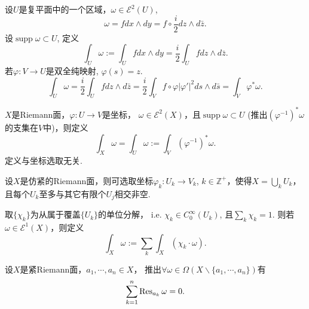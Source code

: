 \begin{definition}
	设$U$是复平面中的一个区域，$\omega\in \mathcal{E}^2(U)$, 
    \[\omega=fdx\wedge dy=f\circ \frac{i}{2}dz\wedge d\bar{z}.\]
    设$\operatorname{supp} \omega\subset U$, 定义
	$$\int_U \omega:=\int_U fdx \wedge dy=\frac{i}{2}\int_U fdz\wedge d\bar{z}.$$
	若$\varphi\colon V\rightarrow U$是双全纯映射, $\varphi(s)=z$.
	$$\int_U\omega =\frac{i}{2}\int_U fdz \wedge d\bar{z}
    =\frac{i}{2}\int_Vf\circ \varphi |\varphi'|^2 ds\wedge d\bar{s}
    =\int_V \varphi^* \omega.$$
\end{definition}
		
\begin{definition}
	$X$是Riemann面，$\varphi\colon U\rightarrow V$是坐标，
    $\omega\in \mathcal{E}^2(X)$，且$\operatorname{supp} \omega \subset U$
    (推出$(\varphi^{-1})^*\omega $的支集在$V$中)，则定义
	$$\int_X \omega =\int_U \omega:=\int_V (\varphi^{-1})^*\omega.$$
	定义与坐标选取无关.
\end{definition}
		
\begin{definition}
	设$X$是仿紧的Riemann面，则可选取坐标$\varphi_k\colon U_k\rightarrow V_k$, 
    $k\in \mathbb{Z}^+$，使得$X=\bigcup\limits_{k} U_k$，
    且每个$U_k$至多与其它有限个$U_j$相交非空.

	取$\{\chi_k\}$为从属于覆盖$\{U_k\}$的单位分解，
    i.e. $\chi_k\in C_0^\infty(U_k)$, 且$\sum\limits_k \chi_k=1$. 
    则若$\omega\in \mathcal{E}^1(X)$，则定义
	$$\int_X\omega:=\sum_k \int_X(\chi_k \cdot \omega).$$
\end{definition}
		
\begin{theorem}[留数定理]
	设$X$是紧Riemann面，$a_1,\cdots, a_n\in X$，
    推出$\forall \omega\in \Omega(X\backslash \{a_1,\cdots,a_n\})$有
	$$\sum_{k=1}^n \operatorname{Res}_{a_k} \omega=0.$$
\end{theorem}
		

